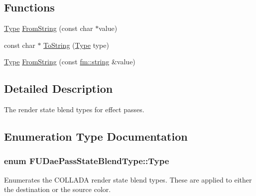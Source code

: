 \subsection*{Functions}
\begin{DoxyCompactItemize}
\item 
\hyperlink{namespaceFUDaePassStateBlendType_a8b19ecfbd7f27a60a30af883541b62b8}{Type} \hyperlink{namespaceFUDaePassStateBlendType_a638bbc6594eac07b9e7068a9230a43d2}{FromString} (const char $\ast$value)
\item 
const char $\ast$ \hyperlink{namespaceFUDaePassStateBlendType_a546d293f6f3c3e7334cfce374d338d32}{ToString} (\hyperlink{namespaceFUDaePassStateBlendType_a8b19ecfbd7f27a60a30af883541b62b8}{Type} type)
\item 
\hyperlink{namespaceFUDaePassStateBlendType_a8b19ecfbd7f27a60a30af883541b62b8}{Type} \hyperlink{namespaceFUDaePassStateBlendType_a35203e319157684af5e39db1a7263758}{FromString} (const \hyperlink{classfm_1_1stringT}{fm::string} \&value)
\end{DoxyCompactItemize}


\subsection{Detailed Description}
The render state blend types for effect passes. 

\subsection{Enumeration Type Documentation}
\hypertarget{namespaceFUDaePassStateBlendType_a8b19ecfbd7f27a60a30af883541b62b8}{
\subsubsection[{Type}]{\setlength{\rightskip}{0pt plus 5cm}enum {\bf FUDaePassStateBlendType::Type}}}
\label{namespaceFUDaePassStateBlendType_a8b19ecfbd7f27a60a30af883541b62b8}
Enumerates the COLLADA render state blend types. These are applied to either the destination or the source color.

